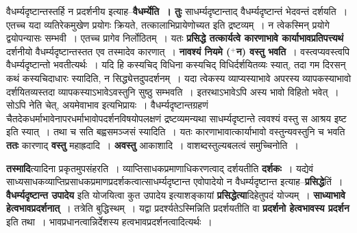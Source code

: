 \documentclass[article,12pt,a4paper]{memoir}
\newcommand{\add}[1]{($^{+}$#1)}
\begin{document}
	  \pstart वैधर्म्यदृष्टान्तस्तर्हि न प्रदर्शनीय इत्याह--\textbf{वैधर्म्येति । तुः} साधर्म्यदृष्टान्ताद् वैधर्म्यदृष्टान्तं भेदवन्तं दर्शयति । एतच्च यदा व्यतिरेकमुखेण प्रयोगः क्रियते, तत्कालाभिप्रायेणोच्यत इति द्रष्टव्यम् । न त्वेकस्मिन् प्रयोगे द्वयोपन्यासः सम्भवी । एतच्च प्रागेव निर्लोठितम् । यतः \textbf{प्रसिद्धे तत्कार्यत्वे कारणाभावे कार्याभावप्रतिपत्त्यथं} दर्शनीयो वैधर्म्यदृष्टान्तस्तत एव तस्मादेव कारणात् । \textbf{नावश्यं नियमे \add{न} वस्तु भवति} । वस्त्वप्यवस्त्वपि वैधर्म्यदृष्टान्तो भवतीत्यर्थः । यदि हि कस्यचिद् विधिना कस्यचिद् विधिर्दर्शयितव्यः स्यात्, तदा गम  दिरसन् कथं कस्यचिदाधारः स्यादिति, न सिद्ध्येत्तदुपदर्शनम् । यदा त्वेकस्य व्याप्यस्याभावे अपरस्य व्यापकस्याभावो दर्शयितव्यस्तदा व्यापकस्याऽभावेऽवस्तुनि सुष्ठु सम्भवति । इतरथाऽभावेऽपि अस्य भावो विहितो भवेत् । सोऽपि नेति चेत्, अयमेवाभाव इत्यभिप्रायः । वैधर्म्यदृष्टान्तग्रहणं चैतदेकधर्माभावेनापरधर्माभावोपदर्शनविषयोपलक्षणं द्रष्टव्यमन्यथा साधर्म्यदृष्टान्ते त्ववश्यं वस्तु स आश्रय इष्ट इति स्यात् । तथा च सति बह्वसमञ्जसं स्यादिति । यतः कारणाभावात्कार्याभावो वस्तुन्यवस्तुनि च भवति \textbf{ततः} कारणाद् \textbf{वस्तु} महाह्रदादि । \textbf{अवस्तु} आकाशादि । वाशब्दस्तुल्यबलत्वं समुच्चिनोति ।
	\pend
      

	  \pstart \textbf{तस्मादि}त्यादिना प्रकृतमुपसंहरति । व्याप्तिसाधकप्रमाणाधिकरणत्वाद् दर्शयतीति \textbf{दर्शकः} । यद्येवं साध्यसाधकव्याप्तिप्रसाधकप्रमाणप्रदर्शकत्वात्साधर्म्यदृष्टान्त एवोपादेयो न वैधर्म्यदृष्टान्त इत्याह--\textbf{प्रसिद्धे}तिं । \textbf{वैधर्म्यदृष्टान्त उपादेय} इति योजयित्वा कुत उपादेय इत्याशङ्कायां \textbf{प्रसिद्धेत्या}दिहेतुपदं योज्यम् । \textbf{साध्याभावे हेत्वभावप्रदर्शनात्} । तत्रेति बुद्धिस्थम् । यद्वा प्रदर्श्यतेऽस्मिन्निति प्रदर्शयतीति वा \textbf{प्रदर्शनो हेत्वभावस्य प्रदर्शन} इति तथा । भावप्रधानत्वान्निर्देशस्य हत्वभावप्रदर्शनत्वादित्यर्थः ।
	\pend
	  \bigskip
	  \begingroup
	
\end{document}
